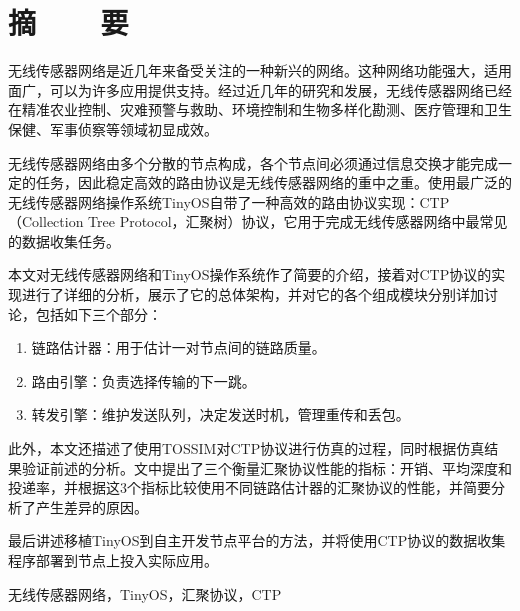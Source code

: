 ﻿%
%
%


%
%
\renewcommand{\baselinestretch}{1.5}
\fontsize{12pt}{13pt}\selectfont

\chapter{摘~~~~要}
无线传感器网络是近几年来备受关注的一种新兴的网络。这种网络功能强大，适用面广，可以为许多应用提供支持。经过近几年的研究和发展，无线传感器网络已经在精准农业控制、灾难预警与救助、环境控制和生物多样化勘测、医疗管理和卫生保健、军事侦察等领域初显成效。

无线传感器网络由多个分散的节点构成，各个节点间必须通过信息交换才能完成一定的任务，因此稳定高效的路由协议是无线传感器网络的重中之重。使用最广泛的无线传感器网络操作系统TinyOS自带了一种高效的路由协议实现：CTP（Collection Tree Protocol，汇聚树）协议，它用于完成无线传感器网络中最常见的数据收集任务。

本文对无线传感器网络和TinyOS操作系统作了简要的介绍，接着对CTP协议的实现进行了详细的分析，展示了它的总体架构，并对它的各个组成模块分别详加讨论，包括如下三个部分：
\vspace{-10pt}
\begin{enumerate}
	\item 链路估计器：用于估计一对节点间的链路质量。
	\item 路由引擎：负责选择传输的下一跳。
	\item 转发引擎：维护发送队列，决定发送时机，管理重传和丢包。
\end{enumerate}
\vspace{-10pt}

此外，本文还描述了使用TOSSIM对CTP协议进行仿真的过程，同时根据仿真结果验证前述的分析。文中提出了三个衡量汇聚协议性能的指标：开销、平均深度和投递率，并根据这3个指标比较使用不同链路估计器的汇聚协议的性能，并简要分析了产生差异的原因。

最后讲述移植TinyOS到自主开发节点平台的方法，并将使用CTP协议的数据收集程序部署到节点上投入实际应用。

\vspace{1em}
 \quad 无线传感器网络，TinyOS，汇聚协议，CTP

